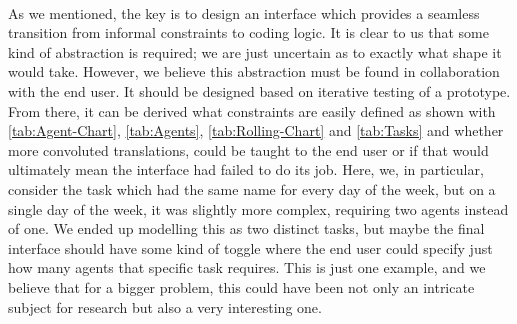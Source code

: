 \\
As we mentioned, the key is to design an interface which provides a seamless transition from informal constraints to coding logic. It is clear to us that some kind of abstraction is required; we are just uncertain as to exactly what shape it would take. However, we believe this abstraction must be found in collaboration with the end user. It should be designed based on iterative testing of a prototype. From there, it can be derived what constraints are easily defined as shown with \autoref{tab:Agent-Chart}, \autoref{tab:Agents}, \autoref{tab:Rolling-Chart} and \autoref{tab:Tasks} and whether more convoluted translations, could be taught to the end user or if that would ultimately mean the interface had failed to do its job. Here, we, in particular, consider the task which had the same name for every day of the week, but on a single day of the week, it was slightly more complex, requiring two agents instead of one. We ended up modelling this as two distinct tasks, but maybe the final interface should have some kind of toggle where the end user could specify just how many agents that specific task requires. This is just one example, and we believe that for a bigger problem, this could have been not only an intricate subject for research but also a very interesting one.

